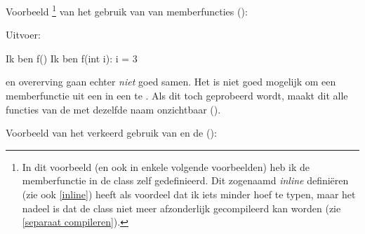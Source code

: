 \begin{cpplstShortInline}
Voorbeeld%
\footnote{%
	In dit voorbeeld (en ook in enkele volgende voorbeelden) heb ik de memberfunctie in de class zelf gedefinieerd.
	Dit zogenaamd \emph{inline} definiëren (zie ook \cref{inline}) heeft als voordeel dat ik iets minder hoef te typen, maar het nadeel is dat de class niet meer afzonderlijk gecompileerd kan worden (zie \cref{separaat compileren}).
} van het gebruik van  van memberfuncties ():

Uitvoer:
\begin{coutput}
Ik ben f()
Ik ben f(int i): i = 3
\end{coutput}

 en overerving gaan echter \emph{niet} goed samen.
Het is niet goed mogelijk om een memberfunctie uit een  in een  te .
Als dit toch geprobeerd wordt, maakt dit alle functies van de  met dezelfde naam onzichtbaar (\emph{}).

Voorbeeld van het verkeerd gebruik van  en de  ():
\begin{cpplstfragment}[mathescape=true]
// Dit voorbeeld laat zien hoe het $\color{hrred}\textbf{NIET}$ moet!
// Je moet overloading en overerving $\color{hrred}\textbf{NIET}$ combineren!

class Base {
	public:
	void f() const {
		println("Ik ben Base::f()");
	}
};

class Derived: public Base {
	public:
	void f(int i) const$%
	\footnotemark%
	\makeatletter%
	\global\let\saved@Href@P\Hy@footnote@currentHref%
	\makeatother%
	$ { // Verberg f() !! Geen goed idee !!!
		println("Ik ben Derived::f(int i): i = {}", i);
	}
};

void func(Base& b) {
	b.f();
}

int main() {
	Base b;
	Derived d;
	
	b.f();
	d.f(3);
	
	d.f(); 
	//  $\color{hrred}\textbf{error:}$ no matching function for call to 'Derived::f()'$%
	\footnotemark%
	\makeatletter%
	\global\let\saved@Href@Q\Hy@footnote@currentHref%
	\makeatother%
	$
	d.Base::f();$%
	\footnotemark%
	\makeatletter%
	\global\let\saved@Href@R\Hy@footnote@currentHref%
	\makeatother%
	$
	// ...    
\end{cpplstfragment}
	

\end{cpplstShortInline}
